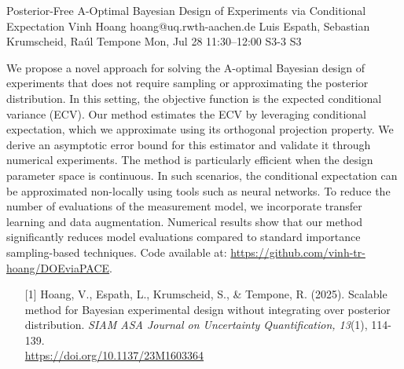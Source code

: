 \begin{talk}
  {Posterior-Free A-Optimal Bayesian Design of Experiments via Conditional Expectation}%
  {Vinh Hoang}%
  {hoang@uq.rwth-aachen.de}%
  {Luis Espath, Sebastian Krumscheid, Ra\'ul Tempone}%
  {}%
  {}%
  {Mon, Jul 28 11:30–12:00}%
  {S3-3}%
  {S3}%
  
				
			

\medskip

We propose a novel approach for solving the A-optimal Bayesian design of experiments that does not require sampling or approximating the posterior distribution. In this setting, the objective function is the expected conditional variance (ECV).
Our method estimates the ECV by leveraging conditional expectation, which we approximate using its orthogonal projection property. We derive an asymptotic error bound for this estimator and validate it through numerical experiments.
The method is particularly efficient when the design parameter space is continuous. In such scenarios, the conditional expectation can be approximated non-locally using tools such as neural networks. To reduce the number of evaluations of the measurement model, we incorporate transfer learning and data augmentation.
Numerical results show that our method significantly reduces model evaluations compared to standard importance sampling-based techniques.
Code available at: \href{https://github.com/vinh-tr-hoang/DOEviaPACE}{https://github.com/vinh-tr-hoang/DOEviaPACE}.

\begin{enumerate}
    \item [{[1]}] Hoang, V., Espath, L., Krumscheid, S., \& Tempone, R. (2025).  
    Scalable method for Bayesian experimental design without integrating over posterior distribution. {\it SIAM ASA Journal on Uncertainty Quantification, 13}(1), 114-139. \\
    \href{https://doi.org/10.1137/23M1603364}{https://doi.org/10.1137/23M1603364}
\end{enumerate}


\end{talk}

